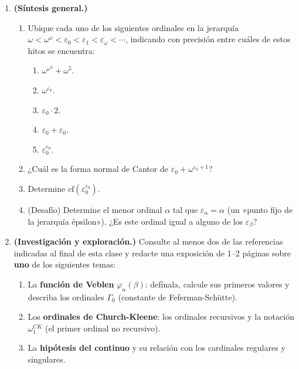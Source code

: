 \begin{enumerate}[leftmargin=2.5em, label=\textbf{\arabic*.}]
  \item \textbf{(Síntesis general.)}
  \begin{enumerate}[label=(\alph*)]
    \item Ubique cada uno de los siguientes ordinales en la jerarquía $\omega < \omega^\omega < \varepsilon_0 < \varepsilon_1 < \varepsilon_\omega < \cdots$, indicando con precisión entre cuáles de estos hitos se encuentra:
    \begin{enumerate}[label=(\roman*)]
      \item $\omega^{\omega^3} + \omega^5$.
      \item $\omega^{\varepsilon_0}$.
      \item $\varepsilon_0 \cdot 2$.
      \item $\varepsilon_0 + \varepsilon_0$.
      \item $\varepsilon_0^{\varepsilon_0}$.
    \end{enumerate}
    \item ¿Cuál es la forma normal de Cantor de $\varepsilon_0 + \omega^{\varepsilon_0+1}$?
    \item Determine $\mathrm{cf}(\varepsilon_0^{\varepsilon_0})$.
    \item (Desafío) Determine el menor ordinal $\alpha$ tal que $\varepsilon_\alpha = \alpha$ (un «punto fijo de la jerarquía épsilon»). ¿Es este ordinal igual a alguno de los $\varepsilon_\beta$?
  \end{enumerate}

  \item \textbf{(Investigación y exploración.)}
  Consulte al menos dos de las referencias indicadas al final de esta clase y redacte una exposición de 1--2 páginas sobre \textbf{uno} de los siguientes temas:
  \begin{enumerate}[label=(\alph*)]
    \item La \textbf{función de Veblen} $\varphi_\alpha(\beta)$: defínala, calcule sus primeros valores y describa los ordinales $\Gamma_0$ (constante de Feferman-Schütte).
    \item Los \textbf{ordinales de Church-Kleene}: los ordinales recursivos y la notación $\omega_1^{CK}$ (el primer ordinal no recursivo).
    \item La \textbf{hipótesis del continuo} y su relación con los cardinales regulares y singulares.
  \end{enumerate}

\end{enumerate}

